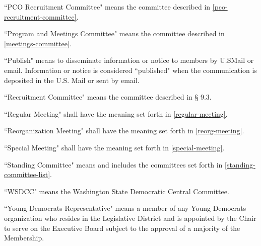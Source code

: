 \begin{alphalist}
    \item ``PCO Recruitment Committee" means the committee described in \autoref{pco-recruitment-committee}.
    \item ``Program and Meetings Committee" means the committee described in \autoref{meetings-committee}.
    \item ``Publish" means to disseminate information or notice to members by U.SMail or email.  Information or notice is considered ``published" when the communication is deposited in the U.S. Mail or sent by email.
    \item ``Recruitment Committee" means the committee described in § 9.3.
    \item ``Regular Meeting" shall have the meaning set forth in \autoref{regular-meeting}.
    \item ``Reorganization Meeting" shall have the meaning set forth in \autoref{reorg-meeting}.
    \item ``Special Meeting" shall have the meaning set forth in \autoref{special-meeting}.
    \item ``Standing Committee" means and includes the committees set forth in \autoref{standing-committee-list}.
    \item ``WSDCC" means the Washington State Democratic Central Committee.
    \item ``Young Democrats Representative" means a member of any Young Democrats organization who resides in the Legislative District and is appointed by the Chair to serve on the Executive Board subject to the approval of a majority of the Membership.
\end{alphalist}

